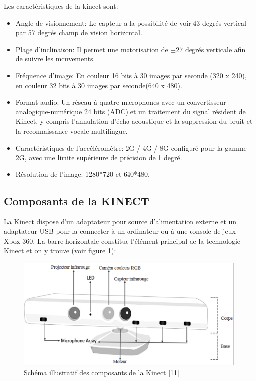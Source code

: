 \documentclass[12pt,a4paper,oneside]{book}
\begin{document}
	Les caractéristiques de la kinect sont:
	\begin{itemize}
		\item Angle de visionnement: Le capteur a la possibilité de  voir  43 degrés vertical par 57 degrés champ de vision horizontal.
		\item Plage d'inclinaison: Il permet une motorisation  de $\pm27$ degrés verticale afin de suivre les mouvements.
		\item Fréquence d'image: En couleur 16 bits à 30 images par seconde (320 x 240), en couleur 32 bits à 30 images par seconde(640 x 480).
		\item Format audio: Un réseau à quatre microphones avec un convertisseur analogique-numérique 24 bits (ADC) et un traitement du signal résident de Kinect, y compris l'annulation d'écho acoustique et la suppression du bruit et la reconnaissance vocale multilingue.
		\item Caractéristiques de l'accéléromètre: 2G / 4G / 8G configuré pour la gamme 2G, avec une limite supérieure de précision de 1 degré.
		\item Résolution de l'image: 1280*720 et 640*480.
	\end{itemize}
	
	\subsection{Composants de la KINECT}
	La Kinect dispose d’un adaptateur pour source d'alimentation externe et un adaptateur USB pour la connecter à un ordinateur ou à une console de jeux Xbox 360. La barre horizontale constitue l'élément principal de la technologie Kinect et on y trouve (voir figure \ref{fig14}):
	
	\begin{figure}[H]
		\centering
		\includegraphics[scale=0.7]{fonctionnementdepth3d.png}
		\caption{Schéma illustratif des composants de la Kinect \textcolor[rgb]{1.00,0.00,0.00}{[11]} }
		\label{fig14}
	\end{figure}
	
\end{document}
